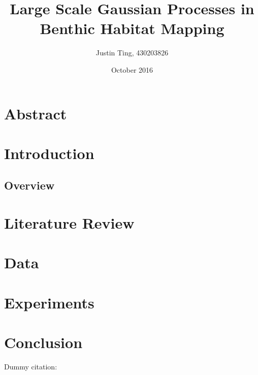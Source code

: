 \documentclass[10pt,sts]{article}
\title{Large Scale Gaussian Processes in Benthic Habitat Mapping}
\author{Justin Ting, 430203826}
\date{October 2016}
\begin{document}
\maketitle

    \section{Abstract}

    \section{Introduction}

    \subsection{Overview}

    \section{Literature Review}

    \section{Data}

    \section{Experiments}

    \section{Conclusion}
    Dummy citation: ~\citep{halpern08}




\end{document}
